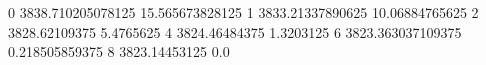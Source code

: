 0 3838.710205078125 15.565673828125
1 3833.21337890625 10.06884765625
2 3828.62109375 5.4765625
4 3824.46484375 1.3203125
6 3823.363037109375 0.218505859375
8 3823.14453125 0.0
